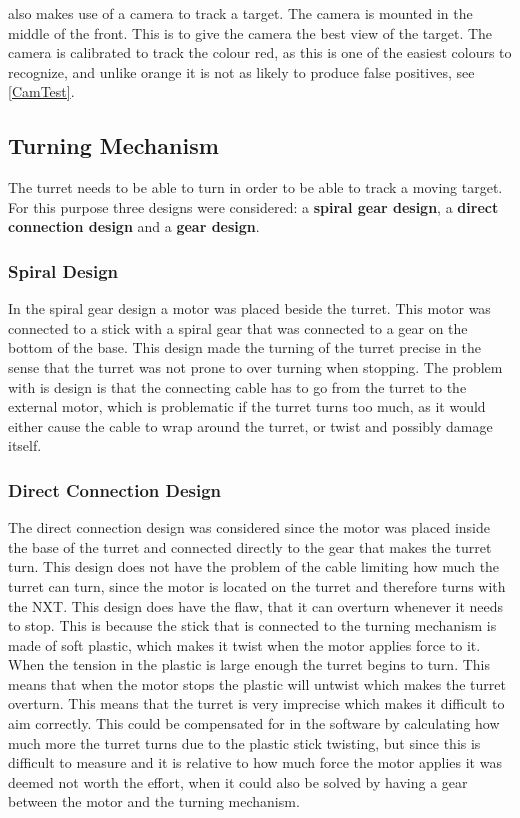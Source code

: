 \name also makes use of a camera to track a target. The camera is mounted in
the middle of the front. This is to give the camera the best view of the target.
The camera is calibrated to track the colour red, as this is one of the
easiest colours to recognize, and unlike orange it is not as likely to produce
false positives, see \autoref{CamTest}.

\subsection{Turning Mechanism}
The turret needs to be able to turn in order to be able to track a moving
target. For this purpose three designs were considered: a \textbf{spiral gear
design}, a \textbf{direct connection design} and a \textbf{gear design}.

\subsubsection{Spiral Design}
In the spiral gear design a motor was placed beside the turret. This motor was
connected to a stick with a spiral gear that was connected to a gear on the
bottom of the base. This design made the turning of the turret precise in the
sense that the turret was not prone to over turning when stopping. The problem
with is design is that the connecting cable has to go from the turret to the
external motor, which is problematic if the turret turns too much, as it would
either cause the cable to wrap around the turret, or twist and possibly damage
itself.

\subsubsection{Direct Connection Design}
The direct connection design was considered since the motor was placed inside
the base of the turret and connected directly to the gear that makes the turret turn. This
design does not have the problem of the cable limiting how much the turret can
turn, since the motor is located on the turret and therefore turns with the
NXT. This design does have the flaw, that it can overturn whenever it needs
to stop. This is because the stick that is connected to the turning mechanism
is made of soft plastic, which makes it twist when the motor applies force to
it. When the tension in the plastic is large enough the turret begins to turn.
This means that when the motor stops the plastic will untwist which makes the
turret overturn. This means that the turret is very imprecise which makes it
difficult to aim correctly. This could be compensated for in the software by
calculating how much more the turret turns due to the plastic stick twisting,
but since this is difficult to measure and it is relative to how much force the motor applies it was deemed
not worth the effort, when it could also be solved by having a gear between
the motor and the turning mechanism.

